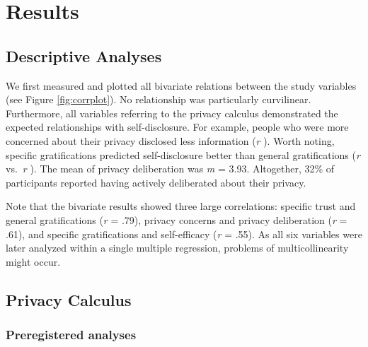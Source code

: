 \documentclass[
  english,
  man,floatsintext]{apa6}
\begin{document}
\hypertarget{results}{%
\section{Results}\label{results}}

\hypertarget{descriptive-analyses}{%
\subsection{Descriptive Analyses}\label{descriptive-analyses}}

We first measured and plotted all bivariate relations between the study variables (see Figure \ref{fig:corrplot}).
No relationship was particularly curvilinear.
Furthermore, all variables referring to the privacy calculus demonstrated the expected relationships with self-disclosure.
For example, people who were more concerned about their privacy disclosed less information (\emph{r} ).
Worth noting, specific gratifications predicted self-disclosure better than general gratifications (\emph{r} vs.~\emph{r} ).
The mean of privacy deliberation was \emph{m} = 3.93. Altogether, 32\% of participants reported having actively deliberated about their privacy.

Note that the bivariate results showed three large correlations:
specific trust and general gratifications (\emph{r} = .79),
privacy concerns and privacy deliberation (\emph{r} = .61),
and specific gratifications and self-efficacy (\emph{r} = .55). As all six variables were later analyzed within a single multiple regression, problems of multicollinearity might occur.

\hypertarget{privacy-calculus}{%
\subsection{Privacy Calculus}\label{privacy-calculus}}

\hypertarget{preregistered-analyses}{%
\subsubsection{Preregistered analyses}\label{preregistered-analyses}}
\end{document}

